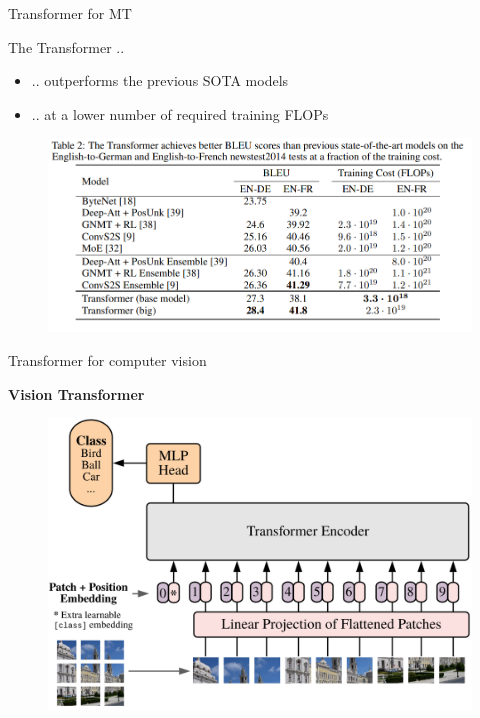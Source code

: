 
\begin{vbframe}{Transformer for MT}

\vfill

The Transformer .. 

\begin{itemize}
	\item .. outperforms the previous SOTA models
	\item .. at a lower number of required training FLOPs
\end{itemize}

\vspace{.3cm}

\begin{figure}
	\centering
		\includegraphics[width=.9\textwidth]{figure/trafo-wmt}\\ 
\end{figure}

\vfill

\end{vbframe}


\begin{vbframe}{Transformer for computer vision}

\vfill

\textbf{Vision Transformer}

\begin{figure}
	\centering
		\includegraphics[width=.7\textwidth]{figure/vision-transformer.png}\\ 
\end{figure}

\vfill

\end{vbframe}

